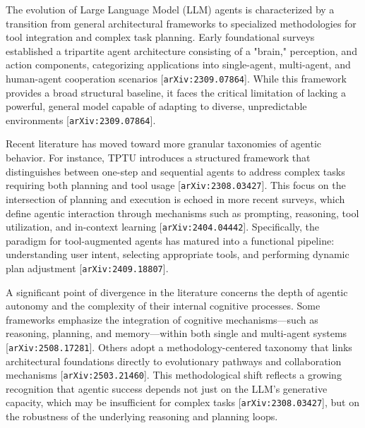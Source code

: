 \documentclass[11pt]{article}
\begin{document}
The evolution of Large Language Model (LLM) agents is characterized by a transition from general architectural frameworks to specialized methodologies for tool integration and complex task planning. Early foundational surveys established a tripartite agent architecture consisting of a "brain," perception, and action components, categorizing applications into single-agent, multi-agent, and human-agent cooperation scenarios [\texttt{arXiv:2309.07864}]. While this framework provides a broad structural baseline, it faces the critical limitation of lacking a powerful, general model capable of adapting to diverse, unpredictable environments [\texttt{arXiv:2309.07864}].

Recent literature has moved toward more granular taxonomies of agentic behavior. For instance, TPTU introduces a structured framework that distinguishes between one-step and sequential agents to address complex tasks requiring both planning and tool usage [\texttt{arXiv:2308.03427}]. This focus on the intersection of planning and execution is echoed in more recent surveys, which define agentic interaction through mechanisms such as prompting, reasoning, tool utilization, and in-context learning [\texttt{arXiv:2404.04442}]. Specifically, the paradigm for tool-augmented agents has matured into a functional pipeline: understanding user intent, selecting appropriate tools, and performing dynamic plan adjustment [\texttt{arXiv:2409.18807}].

A significant point of divergence in the literature concerns the depth of agentic autonomy and the complexity of their internal cognitive processes. Some frameworks emphasize the integration of cognitive mechanisms—such as reasoning, planning, and memory—within both single and multi-agent systems [\texttt{arXiv:2508.17281}]. Others adopt a methodology-centered taxonomy that links architectural foundations directly to evolutionary pathways and collaboration mechanisms [\texttt{arXiv:2503.21460}]. This methodological shift reflects a growing recognition that agentic success depends not just on the LLM's generative capacity, which may be insufficient for complex tasks [\texttt{arXiv:2308.03427}], but on the robustness of the underlying reasoning and planning loops.
\end{document}
